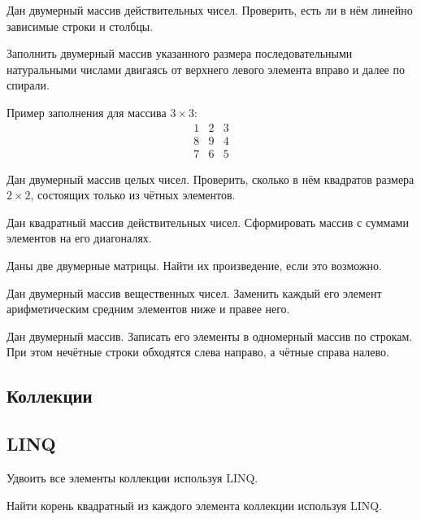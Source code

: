 \task Дан двумерный массив действительных чисел. Проверить, есть ли в
нём линейно зависимые строки и столбцы.

\task Заполнить двумерный массив указанного размера последовательными
натуральными числами двигаясь от верхнего левого элемента вправо и
далее по спирали.

Пример заполнения для массива $3\times 3$:
\[
\begin{array}{ccc}
  1 & 2 & 3 \\
  8 & 9 & 4 \\
  7 & 6 & 5
\end{array}
\]


\task Дан двумерный массив целых чисел. Проверить, сколько в нём
квадратов размера $2\times 2$, состоящих только из чётных элементов.

\task Дан квадратный массив действительных чисел. Сформировать массив
с суммами элементов на его диагоналях.

\task Даны две двумерные матрицы. Найти их произведение, если это
возможно.

\task Дан двумерный массив вещественных чисел. Заменить каждый его
элемент арифметическим средним элементов ниже и правее него.

\task Дан двумерный массив. Записать его элементы в одномерный массив
по строкам. При этом нечётные строки обходятся слева направо, а чётные
справа налево.

\subsection{Коллекции}

\task

\task

\task

\task

\task

\task

\task

\task

\task

\task

\subsection{LINQ}

\task Удвоить все элементы коллекции используя LINQ.

\task Найти корень квадратный из каждого элемента коллекции используя
LINQ.


